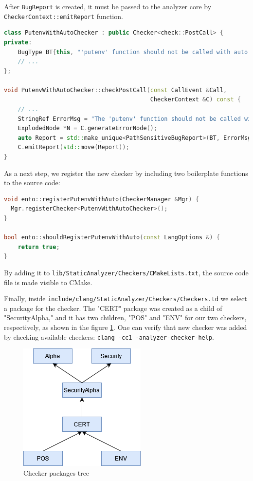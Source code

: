 After \lstinline{BugReport} is created, it must be passed to the analyzer core by \lstinline{CheckerContext::emitReport} function.

\begin{lstlisting}[language={C++}]
class PutenvWithAutoChecker : public Checker<check::PostCall> {
private:
    BugType BT{this, "'putenv' function should not be called with auto variables", categories::SecurityError};
    // ...
};

void PutenvWithAutoChecker::checkPostCall(const CallEvent &Call,
                                          CheckerContext &C) const {
    // ...
    StringRef ErrorMsg = "The 'putenv' function should not be called with arguments that have automatic storage";
    ExplodedNode *N = C.generateErrorNode();
    auto Report = std::make_unique<PathSensitiveBugReport>(BT, ErrorMsg, N);
    C.emitReport(std::move(Report));
}
\end{lstlisting}

As a next step, we register the new checker by including two boilerplate functions to the source code: 
\begin{lstlisting}[language={C++}]
void ento::registerPutenvWithAuto(CheckerManager &Mgr) {
  Mgr.registerChecker<PutenvWithAutoChecker>();
}

bool ento::shouldRegisterPutenvWithAuto(const LangOptions &) { 
    return true; 
}
\end{lstlisting}

By adding it to \lstinline{lib/StaticAnalyzer/Checkers/CMakeLists.txt}, the source code file is made visible to CMake.


Finally, inside \lstinline{include/clang/StaticAnalyzer/Checkers/Checkers.td} we select a package for the checker. The "CERT" package was created as a child of "SecurityAlpha," and it has two children, "POS" and "ENV" for our two checkers, respectively, as shown in the figure \ref{fig:packages}. One can verify that new checker was added by checking available checkers: \lstinline{clang -cc1 -analyzer-checker-help}.


\begin{figure}[H]
	\centering
	\includegraphics[]{images/packages.png}
	\caption{Checker packages tree}
	\label{fig:packages}
\end{figure}


